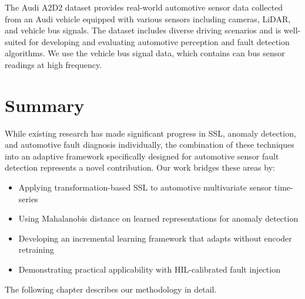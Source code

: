The Audi A2D2 dataset \parencite{geiger2020a2d2} provides real-world automotive sensor data collected from an Audi vehicle equipped with various sensors including cameras, LiDAR, and vehicle bus signals. The dataset includes diverse driving scenarios and is well-suited for developing and evaluating automotive perception and fault detection algorithms. We use the vehicle bus signal data, which contains \gls{can} bus sensor readings at high frequency.

\section{Summary}

While existing research has made significant progress in SSL, anomaly detection, and automotive fault diagnosis individually, the combination of these techniques into an adaptive framework specifically designed for automotive sensor fault detection represents a novel contribution. Our work bridges these areas by:

\begin{itemize}
    \item Applying transformation-based SSL to automotive multivariate sensor time-series
    \item Using Mahalanobis distance on learned representations for anomaly detection
    \item Developing an incremental learning framework that adapts without encoder retraining
    \item Demonstrating practical applicability with HIL-calibrated fault injection
\end{itemize}

The following chapter describes our methodology in detail.
